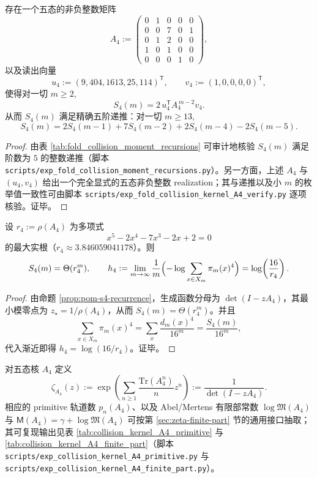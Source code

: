 \begin{proposition}\label{prop:pom-s4-recurrence}
存在一个五态的非负整数矩阵
$$
A_4:=
\begin{pmatrix}
0&1&0&0&0\\
0&0&7&0&1\\
0&1&2&0&0\\
1&0&1&0&0\\
0&0&0&1&0
\end{pmatrix},
$$
以及读出向量
$$
u_4:=(9,404,1613,25,114)^{\mathsf T},\qquad
v_4:=(1,0,0,0,0)^{\mathsf T},
$$
使得对一切 \(m\ge 2\),
$$
S_4(m)=2\,u_4^{\mathsf T}A_4^{\,m-2}v_4.
$$
从而 \(S_4(m)\) 满足精确五阶递推：对一切 \(m\ge 13\),
$$
S_4(m)=2S_4(m-1)+7S_4(m-2)+2S_4(m-4)-2S_4(m-5).
$$
\end{proposition}
\begin{proof}
由表 \ref{tab:fold_collision_moment_recursions} 可审计地核验 \(S_4(m)\) 满足阶数为 \(5\) 的整数递推（脚本 \texttt{scripts/exp\_fold\_collision\_moment\_recursions.py}）。另一方面，上述 \(A_4\) 与 \((u_4,v_4)\) 给出一个完全显式的五态非负整数 realization；其与递推以及小 \(m\) 的枚举值一致性可由脚本 \texttt{scripts/exp\_fold\_collision\_kernel\_A4\_verify.py} 逐项核验。证毕。
\end{proof}

\begin{corollary}\label{cor:pom-s4-asymptotic}
设 \(r_4:=\rho(A_4)\) 为多项式
$$
x^5-2x^4-7x^3-2x+2=0
$$
的最大实根（\(r_4\approx 3.846059041178\)）。则
$$
S_4(m)=\Theta(r_4^m),
\qquad
h_4:=\lim_{m\to\infty}\frac{1}{m}\Bigl(-\log\sum_{x\in X_m}\pi_m(x)^4\Bigr)
=\log\!\left(\frac{16}{r_4}\right).
$$
\end{corollary}
\begin{proof}
由命题 \ref{prop:pom-s4-recurrence}，生成函数分母为 \(\det(I-zA_4)\)，其最小模零点为 \(z_\star=1/\rho(A_4)\)，从而 \(S_4(m)=\Theta(r_4^m)\)。并且
$$
\sum_{x\in X_m}\pi_m(x)^4=\sum_x\frac{d_m(x)^4}{16^m}=\frac{S_4(m)}{16^m},
$$
代入渐近即得 \(h_4=\log(16/r_4)\)。证毕。
\end{proof}

\begin{definition}\label{def:pom-collision-zeta-a4}
对五态核 \(A_4\) 定义
$$
\zeta_{A_4}(z):=\exp\!\left(\sum_{n\ge 1}\frac{\mathrm{Tr}(A_4^n)}{n}z^n\right)
:=\frac{1}{\det(I-zA_4)}.
$$
相应的 primitive 轨道数 \(p_n(A_4)\)、以及 Abel/Mertens 有限部常数 \(\log\mathfrak{M}(A_4)\) 与 \(\mathsf{M}(A_4)=\gamma+\log\mathfrak{M}(A_4)\) 可按第 \ref{sec:zeta-finite-part} 节的通用接口抽取；其可复现输出见表 \ref{tab:collision_kernel_A4_primitive} 与 \ref{tab:collision_kernel_A4_finite_part}（脚本 \texttt{scripts/exp\_collision\_kernel\_A4\_primitive.py} 与 \texttt{scripts/exp\_collision\_kernel\_A4\_finite\_part.py}）。
\end{definition}

